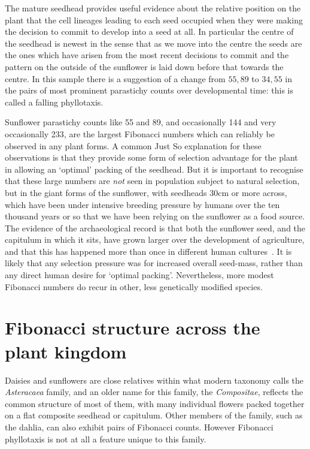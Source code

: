   The mature seedhead provides useful evidence about the relative position on the plant that the cell lineages leading to each seed occupied when they were making the decision to commit to develop into a seed at all. In particular the centre of the seedhead is newest in the sense that as we move into the centre the seeds are the ones which have arisen from the most recent decisions to commit and the pattern on the outside of the sunflower is laid down before that towards the centre.  In this sample there is a suggestion of a change from ${55,89}$ to ${34,55}$ in the pairs of most prominent parastichy counts over developmental time: this is called a falling phyllotaxis. 

Sunflower parastichy counts like 55 and 89, and occasionally 144 and very occasionally 233, are the largest Fibonacci numbers which can reliably be observed in any plant forms. A common Just So explanation for these observations is that they provide some form of selection advantage for the plant in allowing an `optimal' packing of the seedhead. But it is important to recognise that these large numbers are \textit{not} seen in population subject to natural selection, but in the giant forms of the sunflower, with seedheads 30cm or more across, which have been under intensive breeding pressure by humans over the ten thousand years or so that we have been relying on the sunflower as a food source. 
The evidence of the archaeological record is that both
 the sunflower seed, and the capitulum in which it sits, have grown larger over the development of agriculture, and that this has happened more than once in different human cultures~\cite{lentzSunflowerHelianthusAnnuus2008,burkeGeneticAnalysisSunflower2002}. It is likely that any selection pressure was for increased overall seed-mass, rather than any direct human desire for `optimal packing'. Nevertheless, more modest Fibonacci numbers do recur in other, less genetically modified species. 
\clearpage
\section{Fibonacci structure across the plant kingdom}
 Daisies and sunflowers are close relatives within what modern taxonomy calls the \textit{Asteracaea} family,  and an older name for this family, the \textit{Compositae}, reflects the common structure of most of them, with many individual flowers packed together on a flat composite seedhead or capitulum. Other members of the family, such as the dahlia, can also exhibit pairs of Fibonacci counts.
However Fibonacci phyllotaxis is not at all a feature unique to this family.

